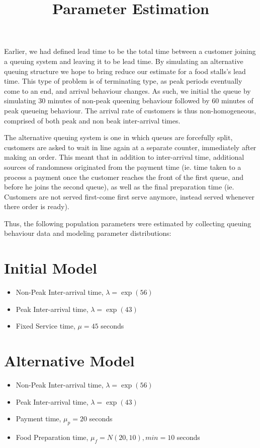 \documentclass{article}
\begin{document}
\pagecolor{ultramarine}
\title{Parameter Estimation}
\author{}
\date{}
\maketitle
Earlier, we had defined lead time to be the total time between a customer joining a queuing system and leaving it to be lead time. By simulating an alternative queuing structure we hope to bring reduce our estimate for a food stalls's lead time. This type of problem is of terminating type, as peak periods eventually come to an end, and arrival behaviour changes. As such, we initial the queue by simulating 30 minutes of non-peak queening behaviour followed by 60 minutes of peak queueing behaviour. The arrival rate of customers is thus non-homogeneous, comprised of both peak and non beak inter-arrival times.

The alternative queuing system is one in which queues are forcefully split, customers are asked to wait in line again at a separate counter, immediately after making an order. This meant that in addition to inter-arrival time, additional sources of randomness originated from the payment time (ie. time taken to a process a payment once the customer reaches the front of the first queue, and before he joins the second queue), as well as the final preparation time (ie. Customers are not served first-come first serve anymore, instead served whenever there order is ready).

Thus, the following population parameters were estimated by collecting queuing
behaviour data and modeling parameter distributions:
\section*{Initial Model}
\begin{itemize}
    \item Non-Peak Inter-arrival time, $\lambda = \exp(56)$
    \item Peak Inter-arrival time, $\lambda = \exp(43)$
    \item Fixed Service time, $\mu = 45$ seconds
\end{itemize}
\section*{Alternative Model}
\begin{itemize}
    \item Non-Peak Inter-arrival time, $\lambda = \exp(56)$
    \item Peak Inter-arrival time, $\lambda = \exp(43)$
    \item Payment time, $\mu_p = 20$ seconds
    \item Food Preparation time, $\mu_f = N(20,10), min=10$ seconds
\end{itemize}
\end{document}
